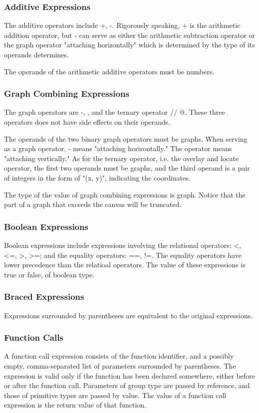 \documentclass[11pt,letterpaper]{article}
\begin{document}
\subsubsection {Additive Expressions}
The additive operators include +, -. Rigorously speaking,  + is the arithmetic addition operator, but - can serve as either the arithmetic subtraction operator or the graph operator "attaching horizontally" which is determined by the type of its operands determines.

The operands of the arithmetic additive operators must be numbers.

\subsubsection {Graph Combining Expressions}
The graph operators are -, \textbar, and the ternary operator // @. These three operators does not have side effects on their operands.

The operands of the two binary graph operators must be graphs. When serving as a graph operator, - means "attaching horizontally." The operator \textbar means "attaching vertically." As for the ternary operator, i.e. the overlay and locate operator, the first two operands must be graphs, and the third operand is a pair of integers in the form of "(x, y)", indicating the coordinates.

The type of the value of graph combining expressions is graph. Notice that the part of a graph that exceeds the canvas will be truncated.

\subsubsection {Boolean Expressions}
Boolean expressions include expressions involving the relational operators:  \textless,  \textless=,  \textgreater,  \textgreater=;  and the equality operators: ==, !=. The equality operators have lower precedence than the relatioal operators. The value of these expressions is true or false, of boolean type.

\subsubsection {Braced Expressions}
Expressions surrounded by parentheses are equivalent to the original expressions.

\subsubsection {Function Calls}
A function call expression consists of the function identifier, and a possibly empty, comma-separated list of parameters surrounded by parentheses. The expression is valid only if the function has been declared somewhere, either before or after the function call. Parameters of group type are passed by reference, and those of primitive types are passed by value. The value of a function call expression is the return value of that function.
\end{document}
